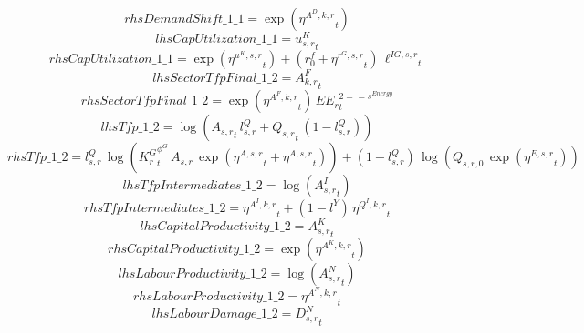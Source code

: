 \begin{dmath*}
rhsDemandShift\_1\_1 = \exp\left({{\eta^{A^{D},k,r}}}_{t}\right)
\end{dmath*}
\begin{dmath*}
lhsCapUtilization\_1\_1 = {{u^K_{s,r}}}_{t}
\end{dmath*}
\begin{dmath*}
rhsCapUtilization\_1\_1 = \exp\left({{\eta^{u^K,s,r}}}_{t}\right)+\left({{r^f_0}}+{{\eta^{r^G,s,r}}}_{t}\right)\, {{\ell^{IG,s,r}}}_{t}
\end{dmath*}
\begin{dmath*}
lhsSectorTfpFinal\_1\_2 = {{A^{F}_{k,r}}}_{t}
\end{dmath*}
\begin{dmath*}
rhsSectorTfpFinal\_1\_2 = \exp\left({{\eta^{A^F,k,r}}}_{t}\right)\, {{EE_r}}_{t}^{2=={{s^{Energy}}}}
\end{dmath*}
\begin{dmath*}
lhsTfp\_1\_2 = \log\left({{A_{s,r}}}_{t}\, {{l^{Q}_{s,r}}}+{{Q_{s,r}}}_{t}\, \left(1-{{l^{Q}_{s,r}}}\right)\right)
\end{dmath*}
\begin{dmath*}
rhsTfp\_1\_2 = {{l^{Q}_{s,r}}}\, \log\left({{K^G_{r}}}_{t}^{{{\phi^{G}}}}\, {{A_{s,r}}}\, \exp\left({{\eta^{A,s,r}}}_{t}+{{\eta^{A,s,r}}}_{t}\right)\right)+\left(1-{{l^{Q}_{s,r}}}\right)\, \log\left({{Q_{s,r,0}}}\, \exp\left({{\eta^{E,s,r}}}_{t}\right)\right)
\end{dmath*}
\begin{dmath*}
lhsTfpIntermediates\_1\_2 = \log\left({{A^{I}_{s,r}}}_{t}\right)
\end{dmath*}
\begin{dmath*}
rhsTfpIntermediates\_1\_2 = {{\eta^{A^{I},k,r}}}_{t}+\left(1-{{l^{Y}}}\right)\, {{\eta^{Q^{I},k,r}}}_{t}
\end{dmath*}
\begin{dmath*}
lhsCapitalProductivity\_1\_2 = {{A^{K}_{s,r}}}_{t}
\end{dmath*}
\begin{dmath*}
rhsCapitalProductivity\_1\_2 = \exp\left({{\eta^{A^{K},k,r}}}_{t}\right)
\end{dmath*}
\begin{dmath*}
lhsLabourProductivity\_1\_2 = \log\left({{A^{N}_{s,r}}}_{t}\right)
\end{dmath*}
\begin{dmath*}
rhsLabourProductivity\_1\_2 = {{\eta^{A^{N},k,r}}}_{t}
\end{dmath*}
\begin{dmath*}
lhsLabourDamage\_1\_2 = {{D^N_{s,r}}}_{t}
\end{dmath*}
